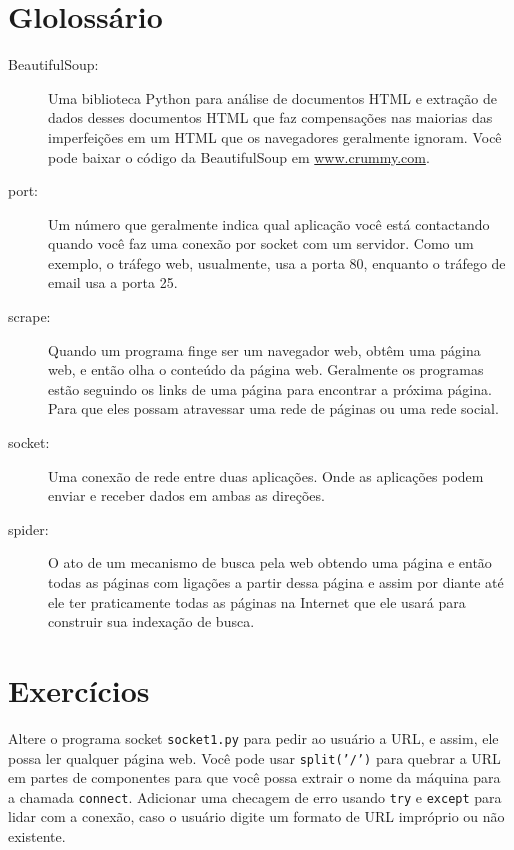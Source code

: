 \section{Glolossário}

\begin{description}

\item[BeautifulSoup:] Uma biblioteca Python para análise de documentos HTML
e extração de dados desses documentos HTML que faz compensações nas
maiorias das imperfeições em um HTML que os navegadores geralmente ignoram.
Você pode baixar o código da BeautifulSoup em 
\url{www.crummy.com}.

\item[port:] Um número que geralmente indica qual aplicação 
você está contactando quando você faz uma conexão por socket com um servidor.
Como um exemplo, o tráfego web, usualmente, usa a porta 80, enquanto o
tráfego de email usa a porta 25.

\item[scrape:] Quando um programa finge ser um navegador web,
obtêm uma página web, e então olha o conteúdo da página web. 
Geralmente os programas estão seguindo os links de uma página para
encontrar a próxima página. Para que eles possam atravessar uma rede de páginas
ou uma rede social.

\item[socket:] Uma conexão de rede entre duas aplicações. Onde as
aplicações podem enviar e receber dados em ambas as direções.

\item[spider:] O ato de um mecanismo de busca pela web obtendo uma
página e então todas as páginas com ligações a partir dessa página e
assim por diante até ele ter praticamente todas as páginas na Internet que
ele usará para construir sua indexação de busca.

\end{description}

\section{Exercícios}

\begin{ex}
Altere o programa socket {\tt socket1.py} para pedir ao usuário a 
URL, e assim, ele possa ler qualquer página web.  
Você pode usar {\tt split('/')} para quebrar a URL em partes de componentes
para que você possa extrair o nome da máquina para a chamada {\tt connect}.
Adicionar uma checagem de erro usando {\tt try} e {\tt except} para lidar
com a conexão, caso o usuário digite um formato de URL impróprio ou
não existente.  
\end{ex}

